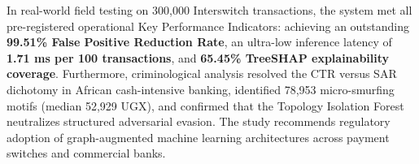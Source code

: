 \documentclass[a4paper,12pt]{report}
\begin{document}
In real-world field testing on 300,000 Interswitch transactions, the system met all pre-registered operational Key Performance Indicators: achieving an outstanding \textbf{99.51\% False Positive Reduction Rate}, an ultra-low inference latency of \textbf{1.71 ms per 100 transactions}, and \textbf{65.45\% TreeSHAP explainability coverage}. Furthermore, criminological analysis resolved the CTR versus SAR dichotomy in African cash-intensive banking, identified 78,953 micro-smurfing motifs (median 52,929 UGX), and confirmed that the Topology Isolation Forest neutralizes structured adversarial evasion. The study recommends regulatory adoption of graph-augmented machine learning architectures across payment switches and commercial banks.

\newpage
{}
\setcounter{page}{1}















\newpage
{}



\newpage
\begin{appendices}



\end{appendices}
\end{document}
